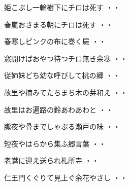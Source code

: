 \begin{shiika}姫こぶし一輪樹下にチロは死す
\hfill{・・}\end{shiika}
\vspace{0.6cm}
\begin{shiika}春嵐おさまる朝にチロは死す
\hfill{・・}\end{shiika}
\vspace{0.6cm}
\begin{shiika}春寒しピンクの布に巻く屍
\hfill{・・}\end{shiika}
\vspace{0.6cm}
\begin{shiika}窓開けばおやつ待つチロ無き余寒
\hfill{・・}\end{shiika}
\vspace{0.6cm}
\begin{shiika}従姉妹どち幼な呼びして桃の郷
\hfill{・・}\end{shiika}
\vspace{0.6cm}
\begin{shiika}故里や摘みてたちまち木の芽和え
\hfill{・・}\end{shiika}
\vspace{0.6cm}
\begin{shiika}故里はお遍路の鈴あわあわと
\hfill{・・}\end{shiika}
\vspace{0.6cm}
\begin{shiika}朧夜や骨までしゃぶる瀬戸の味
\hfill{・・}\end{shiika}
\vspace{0.6cm}
\begin{shiika}短夜やはらから集ふ郷言葉
\hfill{・・}\end{shiika}
\vspace{0.6cm}
\begin{shiika}老鴬に迎え送られ札所寺
\hfill{・・}\end{shiika}
\vspace{0.6cm}
\begin{shiika}仁王門くぐりて見上ぐ余花やさし
\hfill{・・}\end{shiika}
\vspace{0.6cm}
